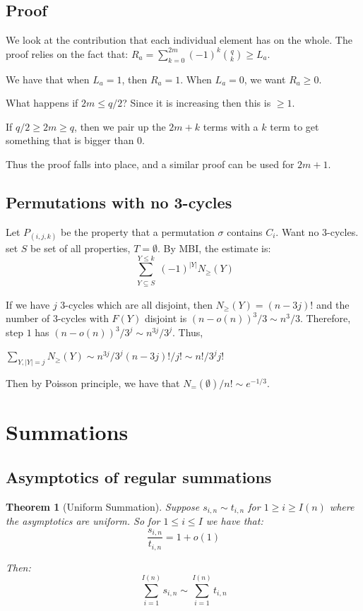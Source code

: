 \documentclass[]{article}
\newtheorem{theorem}{Theorem}
\theoremstyle{definition}
\numberwithin{theorem}{section}
\numberwithin{equation}{section}
\begin{document}
\subsection{Proof}
We look at the contribution that each individual element has on the whole. 
The proof relies on the fact that:
$R_a = \sum_{k = 0}^{2m} (-1)^k \binom{q}{k} \geq L_a$. 

We have that when $L_a = 1$, then $R_a = 1$. When $L_a = 0$, we want $R_a \geq 0$. 

What happens if $2m \leq q/2$? Since it is increasing then this is $\geq 1$.

If $q/2 \geq 2m \geq q$, then we pair up the $2m + k$ terms with a $k$ term to get something that is bigger than 0.

Thus the proof falls into place, and a similar proof can be used for $2m + 1$. 

\subsection{Permutations with no 3-cycles}
Let $P_{(i,j,k)}$ be the property that a permutation $\sigma$ contains $C_i$. Want no 3-cycles. set $S$ be set of all properties, $T = \emptyset$. By MBI, the estimate is:
\begin{equation}
	\sum_{\substack{Y \subseteq S}}^{Y \leq k} (-1)^{|Y|} N_\geq(Y)
\end{equation}

If we have $j$ 3-cycles which are all disjoint, then $N_\geq(Y) = (n - 3j)!$ and the number of 3-cycles with $F(Y)$ disjoint is $(n - o(n))^3/3 \sim n^3/ 3$. Therefore, step $1$ has $(n - o(n))^3/3^j \sim n^{3j}/3^j$. Thus, 

$\sum_{Y, |Y| = j} N_\geq (Y) \sim n^{3j}/3^j (n - 3j)!/j! \sim n!/3^j j!$

Then by Poisson principle, we have that $N_=(\emptyset)/n! \sim e^{- 1/3}$. 

\section{Summations}
\subsection{Asymptotics of regular summations}

\begin{theorem}[Uniform Summation]
	Suppose $s_{i, n} \sim t_{i, n}$ for $ 1\geq i \geq I(n)$ where the asymptotics are uniform. So for $1 \leq i \leq I$ we have that:
\begin{equation}
	\frac{s_{i, n}}{t_{i, n}} = 1 + o(1)
\end{equation}

Then:
\begin{equation}
	\sum_{i = 1}^{I(n)} s_{i, n} \sim \sum_{i = 1}^{I(n)} t_{i, n}
\end{equation}
\end{theorem}
\end{document}
